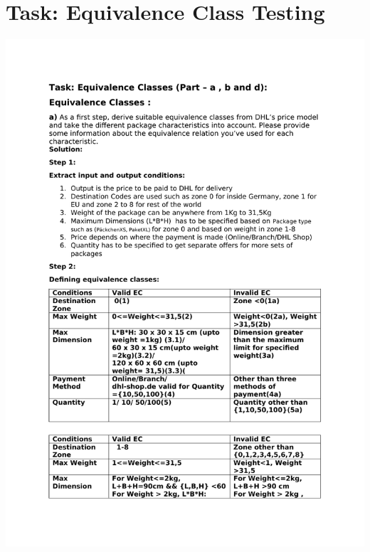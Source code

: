 \documentclass[a4paper,9pt,oneside]{scrreprt}
\begin{document}
	\clearpage
	\section{Task: Equivalence Class Testing}
	\includegraphics[page=1, clip, trim=1cm 2cm 1cm 2cm, scale=0.90]{others.pdf}
	\clearpage
\end{document}
